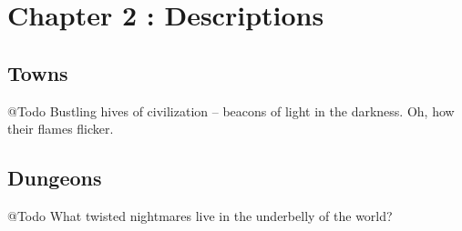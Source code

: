 \chapter{Chapter 2 : Descriptions}

\section{Towns}
@Todo Bustling hives of civilization -- beacons of light in the darkness. Oh, how their flames flicker.



\section{Dungeons}
@Todo What twisted nightmares live in the underbelly of the world?


